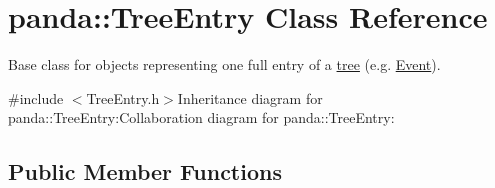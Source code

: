 \hypertarget{classpanda_1_1TreeEntry}{
\section{panda::TreeEntry Class Reference}
\label{classpanda_1_1TreeEntry}
}


Base class for objects representing one full entry of a \hyperlink{namespacepanda_1_1tree}{tree} (e.g. \hyperlink{classpanda_1_1Event}{Event}).  


{\ttfamily \#include $<$TreeEntry.h$>$}Inheritance diagram for panda::TreeEntry:Collaboration diagram for panda::TreeEntry:\subsection*{Public Member Functions}
